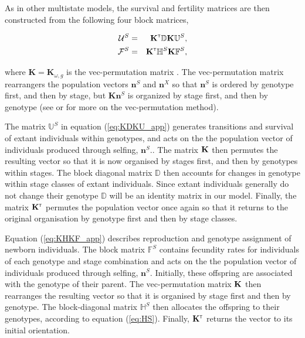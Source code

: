 \documentclass[11pt]{article}
\def\mbb#1{\mathbb{#1}}
\def\mcal#1{\mathcal{#1}}
\newcommand{\bo}[1]{{\bf #1}}
\newcommand{\tr}{{\mbox{\tiny \sf T}}}
\begin{document}
As in other multistate models, the survival and fertility matrices are then constructed from the following four block matrices, 
\begin{linenomath*}
\begin{eqnarray}
\mcal{U}^S &=&\bo K^\tr \mathbb{D} \bo K \mathbb{U}^S, \label{eq:KDKU_app}\\
\mcal{F}^S &=&\bo K^\tr \mbb{H}^S\bo K \mathbb{F}^S, \label{eq:KHKF_app}
\end{eqnarray}
\end{linenomath*}
where $\mathbf{K}=\mathbf{K}_{\omega,g}$ is the vec-permutation matrix \citep{HendersonSearle1981}. The vec-permutation matrix rearrangers the population vectors $\mathbf{n}^S$ and $\mathbf{n}^X$ so that $\mathbf{n}^S$ is ordered by genotype first, and then by stage, but $\mathbf{K} \mathbf{n}^S$ is organized by stage first, and then by genotype (see \cite{hunter2005use} or \cite{caswell2012matrix} for more on the vec-permutation method). 

The matrix $\mathbb{U}^S$ in equation (\ref{eq:KDKU_app}) generates transitions and survival of extant individuals within genotypes,  and acts on the the population vector of individuals produced through selfing, $\mathbf{n}^S$.. The matrix $\bo K$ then permutes the resulting vector so that it is now organised by stages first, and then by genotypes within stages. The block diagonal matrix $ \mathbb{D} $ then accounts for changes in genotype within stage classes of extant individuals. Since extant individuals generally do not change their genotype $\mathbb{D}$ will be an identity matrix in our model. Finally, the matrix $\bo K^\tr $ permutes the population vector once again so that it returns to the original organisation by genotype first and then by stage classes.  

Equation (\ref{eq:KHKF_app}) describes reproduction and genotype assignment of newborn individuals. The block matrix $\mathbb{F}^S$ contains fecundity rates for individuals of each genotype and stage combination and acts on the the population vector of individuals produced through selfing, $\mathbf{n}^S$. Initially, these offspring are associated with the genotype of their parent. The vec-permutation matrix $\bo K$ then rearranges the resulting vector so that it is organised by stage first and then by genotype. The block-diagonal matrix $\mbb{H}^S$ then allocates the offspring to their genotypes, according to equation (\ref{eq:HS}). Finally, $\bo K^\tr $  returns the vector to its initial orientation. 
\end{document}
